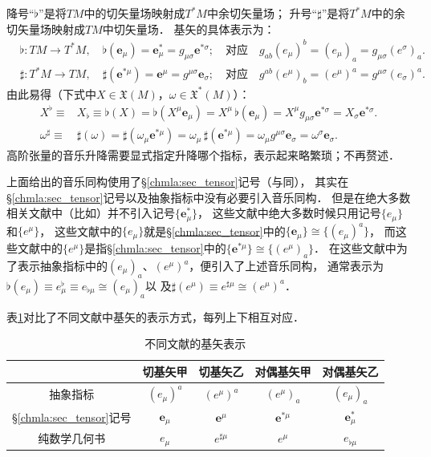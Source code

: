 降号“$\flat$”是将$TM$中的切矢量场映射成$T^*M$中余切矢量场；
升号“$\sharp$”是将$T^*M$中的余切矢量场映射成$TM$中切矢量场．
基矢的具体表示为：
\begin{align*}
	&\flat: TM \to T^*M, \quad \flat(\boldsymbol{e}_\mu) 
	= \boldsymbol{e}_\mu^{*}=g_{\mu \sigma}\boldsymbol{e}^{*\sigma} ;
	\quad \text{对应}\quad
	g_{ab} (e_\mu)^b = (e_\mu)_a =  g_{\mu \sigma} (e^\sigma)_a . \\
	&\sharp: T^*M \to TM, \quad \sharp(\boldsymbol{e}^{*\mu})  
	= \boldsymbol{e}^\mu=g^{\mu \sigma}\boldsymbol{e}_{\sigma} ;
	\quad \text{对应}\quad
	g^{ab} (e^\mu)_b  = (e^\mu)^a=  g^{\mu \sigma} (e_\sigma)^a .
\end{align*}
由此易得（下式中$X\in \mathfrak{X}(M)$，$\omega \in \mathfrak{X}^*(M)$）：
\begin{align*}
	X^{\flat} \equiv& X_{\flat} \equiv \flat(X) = \flat (X^\mu \boldsymbol{e}_\mu) = X^\mu \,  \flat ( \boldsymbol{e}_\mu)
	=X^\mu g_{\mu \sigma}\boldsymbol{e}^{*\sigma} = X_\sigma \boldsymbol{e}^{*\sigma}. \\
	\omega^{\sharp} \equiv& \sharp(\omega) = \sharp(\omega_\mu \boldsymbol{e}^{*\mu})
	= \omega_\mu \,  \sharp( \boldsymbol{e}^{*\mu}) = \omega_\mu g^{\mu \sigma}\boldsymbol{e}_{\sigma}
	=\omega^\sigma \boldsymbol{e}_{\sigma}.
\end{align*}
高阶张量的音乐升降需要显式指定升降哪个指标，表示起来略繁琐；不再赘述．

上面给出的音乐同构使用了\S\ref{chmla:sec_tensor}记号（与\parencite{cc2001-zh}同），
其实在\S\ref{chmla:sec_tensor}记号以及抽象指标中没有必要引入音乐同构．
但是在{\kaishu 绝大多数}相关文献中（比如\parencite{chen-li-2023-2ed-v1,
	lee-2018-irm,tu-IM-2011}）并不引入记号$\{\boldsymbol{e}_\mu^{*}\}$，
这些文献中绝大多数时候只用记号$\{{e}_\mu\}$和$\{{e}^{\mu}\}$，
这些文献中的$\{{e}_\mu\}$就是\S\ref{chmla:sec_tensor}中的$\{\boldsymbol{e}_\mu\}\cong \{(e_\mu)^a\}$，
而这些文献中的$\{{e}^{\mu}\}$是指\S\ref{chmla:sec_tensor}中的$\{\boldsymbol{e}^{*\mu}\}\cong \{(e^\mu)_a\}$．
在这些文献中为了表示抽象指标中的$(e_\mu)_a$、$(e^\mu)^a$，便引入了上述音乐同构，
通常表示为$\flat(e_\mu) \equiv {e}_\mu^\flat \equiv {e}_{\flat \mu} \cong (e_\mu)_a$以
及$\sharp(e^\mu)\equiv {e}^{\sharp \mu} \cong (e^\mu)^a$．


表\ref{chrg:tab-base}对比了不同文献中基矢的表示方式，每列上下相互对应．

\begin{table}[htb]
	\centering
	\caption{不同文献的基矢表示} \label{chrg:tab-base}
	\begin{tabular}{|*5{c|}}
		\hline
		{} & 切基矢甲 & 切基矢乙 & 对偶基矢甲 & 对偶基矢乙 \\ \hline
		抽象指标 & $(e_\mu)^a $ & $ (e^\mu)^a$  & $(e^\mu)_a$ & $(e_\mu)_a$ \\ \hline
		\S\ref{chmla:sec_tensor}记号 & $\boldsymbol{e}_{\mu}$& $\boldsymbol{e}^{\mu}$ 
		& $\boldsymbol{e}^{*\mu}$& $ \boldsymbol{e}^{*}_{\mu}$ \\ \hline
		纯数学几何书 & ${e}_\mu$ & $ {e}^{\sharp \mu}$ 
		& ${e}^\mu $ & ${e}_{\flat \mu} $  	\\ \hline
	\end{tabular}
\end{table}

